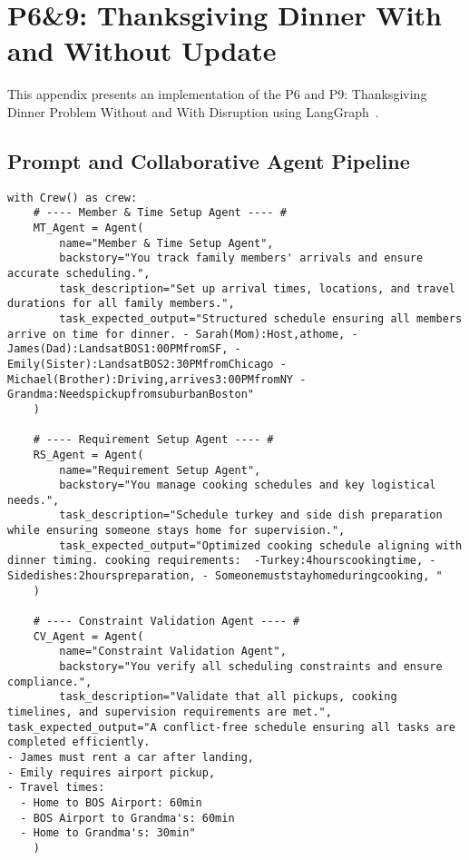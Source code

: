 

\section{P6\&9: Thanksgiving Dinner With and Without Update}

This appendix presents an implementation of the P6 and P9: Thanksgiving Dinner Problem Without and With Disruption using LangGraph~\cite{langgraph2024}. 
\subsection{Prompt and Collaborative Agent Pipeline}

\begin{lstlisting}[style=PythonStyle, caption=Prompt and Collaborative Agent Pipeline, label=lst:agent_pipeline]
with Crew() as crew:
    # ---- Member & Time Setup Agent ---- #
    MT_Agent = Agent(
        name="Member & Time Setup Agent",
        backstory="You track family members' arrivals and ensure accurate scheduling.",
        task_description="Set up arrival times, locations, and travel durations for all family members.",
        task_expected_output="Structured schedule ensuring all members arrive on time for dinner. - Sarah(Mom):Host,athome, - James(Dad):LandsatBOS1:00PMfromSF, - Emily(Sister):LandsatBOS2:30PMfromChicago - Michael(Brother):Driving,arrives3:00PMfromNY - Grandma:NeedspickupfromsuburbanBoston"
    )
    
    # ---- Requirement Setup Agent ---- #
    RS_Agent = Agent(
        name="Requirement Setup Agent",
        backstory="You manage cooking schedules and key logistical needs.",
        task_description="Schedule turkey and side dish preparation while ensuring someone stays home for supervision.",
        task_expected_output="Optimized cooking schedule aligning with dinner timing. cooking requirements:  -Turkey:4hourscookingtime, - Sidedishes:2hourspreparation, - Someonemuststayhomeduringcooking, "
    )
    
    # ---- Constraint Validation Agent ---- #
    CV_Agent = Agent(
        name="Constraint Validation Agent",
        backstory="You verify all scheduling constraints and ensure compliance.",
        task_description="Validate that all pickups, cooking timelines, and supervision requirements are met.",
task_expected_output="A conflict-free schedule ensuring all tasks are completed efficiently.
- James must rent a car after landing,
- Emily requires airport pickup,
- Travel times:
  - Home to BOS Airport: 60min
  - BOS Airport to Grandma's: 60min
  - Home to Grandma's: 30min"
    )
    

\end{lstlisting}
